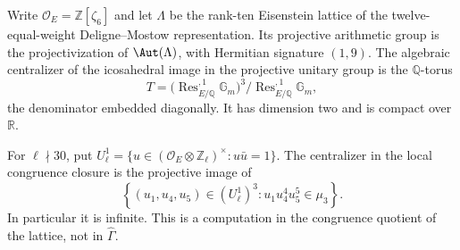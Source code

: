 Write \(\mathcal O_E=\mathbb Z[\zeta_6]\) and let
\(\Lambda\) be the rank-ten Eisenstein lattice of the
twelve-equal-weight Deligne--Mostow representation. Its projective
arithmetic group is the projectivization of \(\Aut(\Lambda)\),
with Hermitian signature \((1,9)\). The algebraic centralizer
of the icosahedral image in the projective unitary group is the
\(\mathbb Q\)-torus
\[
 T=\bigl(\operatorname{Res}^{,1}_{E/\mathbb Q}\mathbb G_m\bigr)^3
       /\operatorname{Res}^{,1}_{E/\mathbb Q}\mathbb G_m,
\]
the denominator embedded diagonally. It has dimension two and
is compact over \(\mathbb R\).

For \(\ell\nmid30\), put
\(U_\ell^1=\{u\in(\mathcal O_E\otimes\mathbb Z_\ell)^\times:
u\bar u=1\}\). The centralizer in the local congruence closure
is the projective image of
\[
 \left\{(u_1,u_4,u_5)\in(U_\ell^1)^3:
                 u_1u_4^4u_5^5\in\mu_3\right\}.       \tag{B.23.1}
\]
In particular it is infinite. This is a computation in the
congruence quotient of the lattice, not in \(\widehat\Gamma\).
